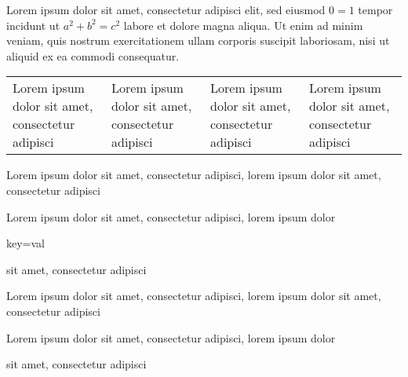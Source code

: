 Lorem ipsum dolor sit amet, consectetur adipisci elit, sed eiusmod
\(0 = 1\) tempor incidunt ut $a^{2} + b^{2} = c^{2}$ labore et dolore
magna aliqua.  Ut enim ad minim veniam, quis nostrum exercitationem
ullam corporis suscipit laboriosam, nisi ut aliquid ex ea commodi
consequatur.

\begin{tabular}{| l | l | l | l |}
  Lorem ipsum dolor sit amet, consectetur adipisci & Lorem ipsum dolor sit amet, consectetur adipisci & Lorem ipsum dolor sit amet, consectetur adipisci & Lorem ipsum dolor sit amet, consectetur adipisci
\end{tabular}

Lorem ipsum dolor sit amet, consectetur adipisci, lorem ipsum dolor
\captionsetup{key=val} sit amet, consectetur adipisci

Lorem ipsum dolor sit amet, consectetur adipisci, lorem ipsum dolor
\caption{key=val}
sit amet, consectetur adipisci

Lorem ipsum dolor sit amet, consectetur adipisci, lorem ipsum dolor
\parencite{key} sit amet, consectetur adipisci

Lorem ipsum dolor sit amet, consectetur adipisci, lorem ipsum dolor
\par
sit amet, consectetur adipisci
